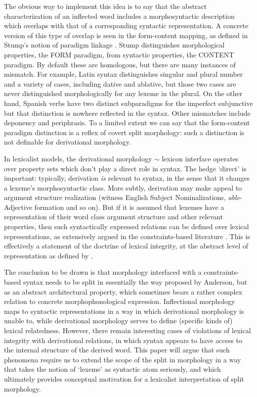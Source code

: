 \documentclass[output=paper,
modfonts
]{LSP/langsci}
\begin{document}
 The obvious way to implement this idea is to say that the abstract characterization of an inflected word includes a morphosyntactic description which overlaps with that of a corresponding syntactic representation. A concrete version of this type of overlap is seen in the form-content mapping, as defined in Stump’s notion of paradigm linkage %
 \parencite{Spencer:Stump13:Hungproncase, Stewart:Stump07,Stump02:paradigmlinkage,Stump06:heteroclisis,Stump16:book,Stump16:MorphMetatheory}.	%
Stump distinguishes morphological properties, the FORM paradigm, from syntactic properties, the CONTENT paradigm. By default these are homologous, but there are many instances of mismatch. For example, Latin syntax distinguishes singular and plural number and a variety of cases, including dative and ablative, but those two cases are never distinguished morphologically for any lexeme in the plural. On the other hand, Spanish verbs have two distinct subparadigms for the imperfect subjunctive but that distinction is nowhere reflected in the syntax. Other mismatches include deponency and periphrasis. To a limited extent we can say that the form-content paradigm distinction is a reflex of covert split morphology: such a distinction is not definable for derivational morphology. 
 
 In lexicalist models, the derivational morphology $\sim$ lexicon interface operates over property sets which don’t play a direct role in syntax. The hedge ‘direct’ is important: typically, derivation \emph{is} relevant to syntax, in the sense that it changes a lexeme’s morphosyntactic class. More subtly, derivation may make appeal to argument structure realization (witness English Subject Nominalizations, \emph{able}-Adjective formation and so on). But if it is assumed that lexemes have a representation of their word class argument structure and other relevant properties, then such syntactically expressed
relations can be defined over lexical representations, as extensively argued in the constraints-based literature  %
\parencite[see][for a review]{Wechsler14:book}.
This is effectively a statement of the doctrine of lexical integrity,	
at the abstract level of representation as defined by %
\textcite{Ackerman:LeSourd97}.

The conclusion to be drawn is that morphology interfaced with a constraints-based syntax needs to be split in essentially the way proposed by Anderson, but as an abstract architectural property, which sometimes bears a rather complex relation to concrete morphophonological expression. Inflectional morphology maps to syntactic representations in a way in which derivational morphology is unable to, while derivational morphology serves to define (specific kinds of) lexical relatedness. However, there remain interesting cases of violations of lexical integrity with derivational relations, in which syntax appears to have access to the internal structure of the derived word.  This paper will argue that such phenomena require us to extend the scope of the split in morphology in a way that takes the notion of ‘lexeme’ as syntactic atom seriously, and which ultimately provides conceptual motivation for a lexicalist interpretation of split morphology. 
\end{document}
